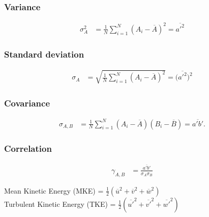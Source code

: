 \documentclass[fleqn,10pt]{SelfArx} %
\begin{document}
\subsubsection{Variance}
\begin{align*}
	\sigma_A^2 & = \frac{1}{N} \sum^N_{i=1}(A_i-\overline{A})^2 = \overline{a'^2}
\end{align*}

\subsubsection{Standard deviation}
\begin{align*}
	\sigma_A & = \sqrt{\frac{1}{N} \sum^N_{i=1}(A_i-\overline{A})^2} = \Big(\overline{a'^2}\Big)^2
\end{align*}

\subsubsection{Covariance}
\begin{align*}
	\sigma_{A,B} & = \frac{1}{N} \sum_{i=1}^N (A_i - \overline{A})(B_i - \overline{B}) = \overline{a'b'}.
\end{align*}

\subsubsection{Correlation}
\begin{align*}
	\gamma_{A,B} & = \frac{\overline{a'b'}}{\sigma_A\sigma_B}
\end{align*}

Mean Kinetic Energy (MKE) = $\frac{1}{2}(\overline{u}^2 + \overline{v}^2 +\overline{w}^2)$ \\
Turbulent Kinetic Energy (TKE) = $\frac{1}{2}(\overline{u'}^2 + \overline{v'}^2 +\overline{w'}^2)$
\end{document}
